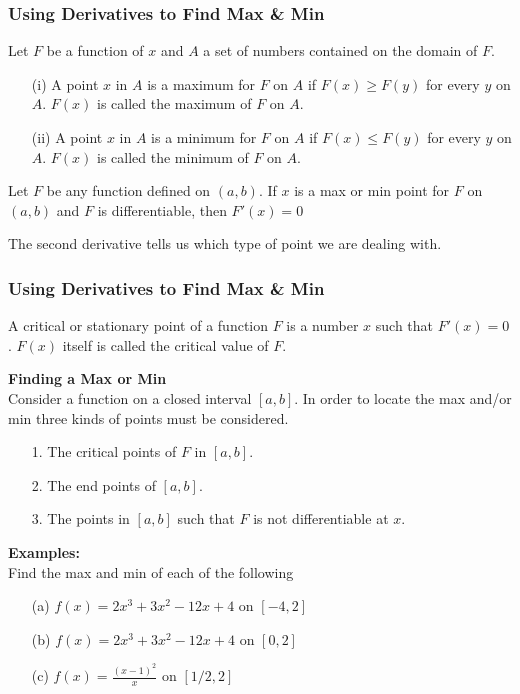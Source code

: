 \documentclass{beamer}
\begin{document}
\begin{frame}
\frametitle{\textbf{Using Derivatives to Find Max \& Min}}
Let $F$ be a function of $x$ and $A$ a set of numbers contained on the domain of $F$. 
\begin{itemize}
	\item[(i)] A point $x$ in $A$ is a maximum for $F$ on $A$ if $F(x) \geq F(y)$ for every $y$ on $A$. $F(x)$ is called the maximum of $F$ on $A$.
	\item[(ii)] A point $x$ in $A$ is a minimum for $F$ on $A$ if $F(x) \leq F(y)$ for every $y$ on $A$. $F(x)$ is called the minimum of $F$ on $A$.
\end{itemize}

\begin{theorem}
	Let $F$ be any function defined on $(a,b)$. If $x$ is a max or min point for $F$ on $(a,b)$ and $F$ is differentiable, then $F'(x)=0$
\end{theorem}

 The second derivative tells us which type of point we are dealing with.

\end{frame}

\begin{frame}
\frametitle{\textbf{Using Derivatives to Find Max \& Min}}
A critical or stationary point of a function $F$ is a number $x$ such that $F'(x)=0$. $F(x)$ itself is called the critical value of $F$.

\vspace{6pt}
\textbf{Finding a Max or Min}\\
Consider a function on a closed interval $[a,b]$. In order to locate the max and/or min three kinds of points must be considered. 
\begin{itemize}
	\item[1.]The critical points of $F$ in $[a,b]$.
	\item[2.]The end points of $[a,b]$.
	\item[3.]The points in $[a,b]$ such that $F$ is not differentiable at $x$.
\end{itemize}

\vspace{6pt}
\textbf{Examples:}\\
Find the max and min of each of the following
\begin{itemize}
	\item[(a)] $f(x) = 2x^3+3x^2-12x+4$ on $[-4,2]$
	\item[(b)]$f(x) = 2x^3+3x^2-12x+4$ on $[0,2]$
	\item[(c)] $f(x)=\frac{(x-1)^2}{x}$ on $[1/2,2]$
\end{itemize}
\end{frame}
\end{document}
